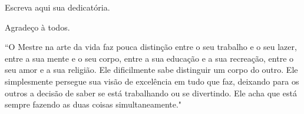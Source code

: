\begin{dedicatoria}%
Escreva aqui sua dedicatória.
\end{dedicatoria}

\begin{agradecimento}
Agradeço à todos.
\end{agradecimento}%


\begin{epigrafo}
``O Mestre na arte da vida faz pouca distinção entre o seu trabalho e o seu lazer, entre a sua mente e o seu corpo, entre a sua educação e a sua recreação, entre o seu amor e a sua religião. Ele dificilmente sabe distinguir um corpo do outro. Ele simplesmente persegue sua visão de excelência em tudo que faz, deixando para os outros a decisão de saber se está trabalhando ou se divertindo. Ele acha que está sempre fazendo as duas coisas simultaneamente."
\end{epigrafo}